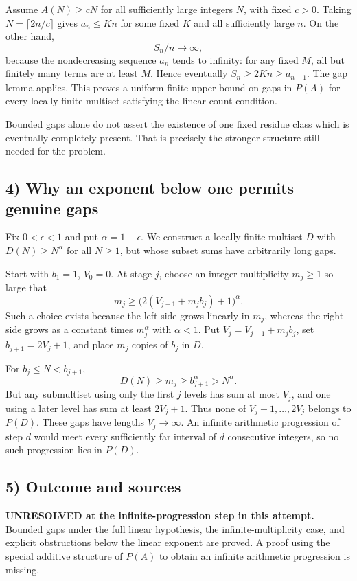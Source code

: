 Assume $A(N)\ge cN$ for all sufficiently large integers $N$, with fixed $c>0$. Taking $N=\lceil2n/c\rceil$ gives $a_n\le Kn$ for some fixed $K$ and all sufficiently large $n$. On the other hand,
\[S_n/n\longrightarrow\infty,
\]
because the nondecreasing sequence $a_n$ tends to infinity: for any fixed $M$, all but finitely many terms are at least $M$. Hence eventually $S_n\ge2Kn\ge a_{n+1}$. The gap lemma applies. This proves a uniform finite upper bound on gaps in $P(A)$ for every locally finite multiset satisfying the linear count condition.

Bounded gaps alone do not assert the existence of one fixed residue class which is eventually completely present. That is precisely the stronger structure still needed for the problem.

\subsection*{4) Why an exponent below one permits genuine gaps}
Fix $0<\epsilon<1$ and put $\alpha=1-\epsilon$. We construct a locally finite multiset $D$ with $D(N)\ge N^\alpha$ for all $N\ge1$, but whose subset sums have arbitrarily long gaps.

Start with $b_1=1$, $V_0=0$. At stage $j$, choose an integer multiplicity $m_j\ge1$ so large that
\[m_j\ge\bigl(2(V_{j-1}+m_jb_j)+1\bigr)^\alpha.
\]
Such a choice exists because the left side grows linearly in $m_j$, whereas the right side grows as a constant times $m_j^\alpha$ with $\alpha<1$. Put $V_j=V_{j-1}+m_jb_j$, set $b_{j+1}=2V_j+1$, and place $m_j$ copies of $b_j$ in $D$.

For $b_j\le N<b_{j+1}$,
\[D(N)\ge m_j\ge b_{j+1}^\alpha>N^\alpha.
\]
But any submultiset using only the first $j$ levels has sum at most $V_j$, and one using a later level has sum at least $2V_j+1$. Thus none of $V_j+1,\ldots,2V_j$ belongs to $P(D)$. These gaps have lengths $V_j\to\infty$. An infinite arithmetic progression of step $d$ would meet every sufficiently far interval of $d$ consecutive integers, so no such progression lies in $P(D)$.

\subsection*{5) Outcome and sources}
\textbf{UNRESOLVED at the infinite-progression step in this attempt.} Bounded gaps under the full linear hypothesis, the infinite-multiplicity case, and explicit obstructions below the linear exponent are proved. A proof using the special additive structure of $P(A)$ to obtain an infinite arithmetic progression is missing.

